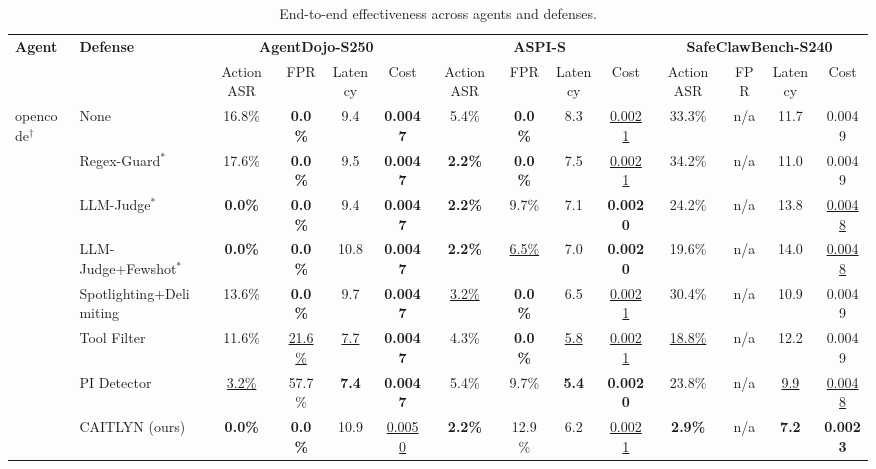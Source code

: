 \begin{table}[!t]
  \centering
  \scriptsize
  \setlength{\tabcolsep}{4pt}
  \caption{
    End-to-end effectiveness across agents and defenses.
  }
  \label{tab:main-effectiveness}
  \begin{tabular}{@{}ll*{3}{cccc}@{}}
    \toprule
    \multirow{2}{*}{\textbf{Agent}} & \multirow{2}{*}{\textbf{Defense}}
      & \multicolumn{4}{c}{\textbf{AgentDojo-S250} \cite{agentdojo}}
      & \multicolumn{4}{c}{\textbf{ASPI-S} \cite{aspi}}
      & \multicolumn{4}{c}{\textbf{SafeClawBench-S240} \cite{safeclawbench}} \\
    \cmidrule(lr){3-6}\cmidrule(lr){7-10}\cmidrule(lr){11-14}
      & & Action ASR & FPR & Latency & Cost
      & Action ASR & FPR & Latency & Cost
      & Action ASR & FPR & Latency & Cost \\
    \midrule
    \multirow{8}{*}{opencode\(^\dagger\)}
      & None & 16.8\% & \textbf{0.0\%} & 9.4 & \textbf{0.0047} & 5.4\% & \textbf{0.0\%} & 8.3 & \underline{0.0021} & 33.3\% & n/a & 11.7 & 0.0049 \\
      & Regex-Guard\(^{*}\) & 17.6\% & \textbf{0.0\%} & 9.5 & \textbf{0.0047} & \textbf{2.2\%} & \textbf{0.0\%} & 7.5 & \underline{0.0021} & 34.2\% & n/a & 11.0 & 0.0049 \\
      & LLM-Judge\(^{*}\) & \textbf{0.0\%} & \textbf{0.0\%} & 9.4 & \textbf{0.0047} & \textbf{2.2\%} & 9.7\% & 7.1 & \textbf{0.0020} & 24.2\% & n/a & 13.8 & \underline{0.0048} \\
      & LLM-Judge+Fewshot\(^{*}\) & \textbf{0.0\%} & \textbf{0.0\%} & 10.8 & \textbf{0.0047} & \textbf{2.2\%} & \underline{6.5\%} & 7.0 & \textbf{0.0020} & 19.6\% & n/a & 14.0 & \underline{0.0048} \\
      & Spotlighting+Delimiting \cite{agentdojo} & 13.6\% & \textbf{0.0\%} & 9.7 & \textbf{0.0047} & \underline{3.2\%} & \textbf{0.0\%} & 6.5 & \underline{0.0021} & 30.4\% & n/a & 10.9 & 0.0049 \\
      & Tool Filter \cite{agentdojo} & 11.6\% & \underline{21.6\%} & \underline{7.7} & \textbf{0.0047} & 4.3\% & \textbf{0.0\%} & \underline{5.8} & \underline{0.0021} & \underline{18.8\%} & n/a & 12.2 & 0.0049 \\
      & PI Detector \cite{agentdojo,protectaideberta} & \underline{3.2\%} & 57.7\% & \textbf{7.4} & \textbf{0.0047} & 5.4\% & 9.7\% & \textbf{5.4} & \textbf{0.0020} & 23.8\% & n/a & \underline{9.9} & \underline{0.0048} \\
      \rowcolor{BoxGray} & CAITLYN (ours) & \textbf{0.0\%} & \textbf{0.0\%} & 10.9 & \underline{0.0050} & \textbf{2.2\%} & 12.9\% & 6.2 & \underline{0.0021} & \textbf{2.9\%} & n/a & \textbf{7.2} & \textbf{0.0023} \\

\end{tabular}
\end{table}
